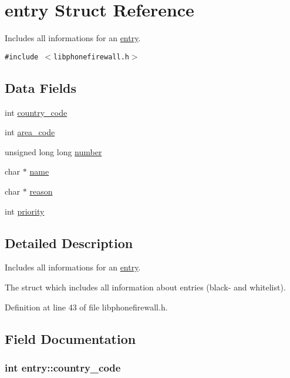\hypertarget{structentry}{
\section{entry Struct Reference}
\label{structentry}
}
Includes all informations for an \hyperlink{structentry}{entry}.  


{\tt \#include $<$libphonefirewall.h$>$}

\subsection*{Data Fields}
\begin{CompactItemize}
\item 
int \hyperlink{structentry_c226bdbc2ae976e6287e0f76d5346bff}{country\_\-code}
\item 
int \hyperlink{structentry_0e8fbe135bf7735f8675b6829ac943c3}{area\_\-code}
\item 
unsigned long long \hyperlink{structentry_ba7411d38f6779700ca594ebb2db3201}{number}
\item 
char $\ast$ \hyperlink{structentry_ef8962564a1a313a7ddc320bb4ed739c}{name}
\item 
char $\ast$ \hyperlink{structentry_1bcaeeed116744379db6ff5c671856a2}{reason}
\item 
int \hyperlink{structentry_65a11c5accccc3ac72247a12d53098d1}{priority}
\end{CompactItemize}


\subsection{Detailed Description}
Includes all informations for an \hyperlink{structentry}{entry}. 

The struct which includes all information about entries (black- and whitelist). 

Definition at line 43 of file libphonefirewall.h.

\subsection{Field Documentation}
\hypertarget{structentry_c226bdbc2ae976e6287e0f76d5346bff}{
\subsubsection{\setlength{\rightskip}{0pt plus 5cm}int {\bf entry::country\_\-code}}}
\label{structentry_c226bdbc2ae976e6287e0f76d5346bff}




